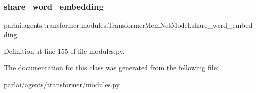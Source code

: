 \subsubsection{\texorpdfstring{share\+\_\+word\+\_\+embedding}{share\_word\_embedding}}
{\footnotesize\ttfamily parlai.\+agents.\+transformer.\+modules.\+Transformer\+Mem\+Net\+Model.\+share\+\_\+word\+\_\+embedding}



Definition at line 155 of file modules.\+py.



The documentation for this class was generated from the following file\+:\begin{DoxyCompactItemize}
\item 
parlai/agents/transformer/\hyperlink{parlai_2agents_2transformer_2modules_8py}{modules.\+py}\end{DoxyCompactItemize}
